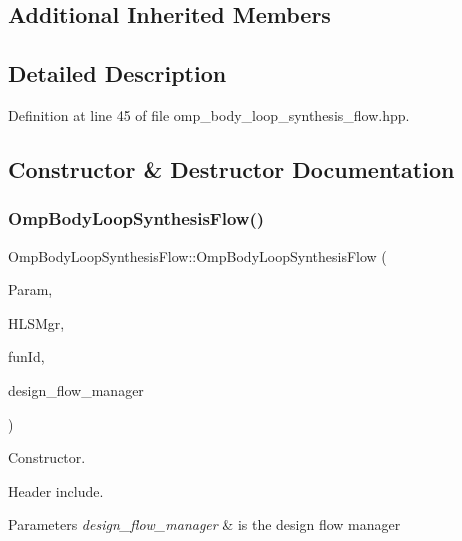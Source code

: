 \subsection*{Additional Inherited Members}


\subsection{Detailed Description}


Definition at line 45 of file omp\+\_\+body\+\_\+loop\+\_\+synthesis\+\_\+flow.\+hpp.



\subsection{Constructor \& Destructor Documentation}
\mbox{\label{classOmpBodyLoopSynthesisFlow_aae94b58f7ca30ae522a0c8ba5797b39f}} 
\subsubsection{\texorpdfstring{Omp\+Body\+Loop\+Synthesis\+Flow()}{OmpBodyLoopSynthesisFlow()}}
{\footnotesize\ttfamily Omp\+Body\+Loop\+Synthesis\+Flow\+::\+Omp\+Body\+Loop\+Synthesis\+Flow (\begin{DoxyParamCaption}\item[{const \hyperlink{Parameter_8hpp_a37841774a6fcb479b597fdf8955eb4ea}{Parameter\+Const\+Ref}}]{Param,  }\item[{const \hyperlink{hls__manager_8hpp_acd3842b8589fe52c08fc0b2fcc813bfe}{H\+L\+S\+\_\+manager\+Ref}}]{H\+L\+S\+Mgr,  }\item[{unsigned int}]{fun\+Id,  }\item[{const Design\+Flow\+Manager\+Const\+Ref}]{design\+\_\+flow\+\_\+manager }\end{DoxyParamCaption})}



Constructor. 

Header include.


\begin{DoxyParams}{Parameters}
{\em design\+\_\+flow\+\_\+manager} & is the design flow manager \\
\hline
\end{DoxyParams}



